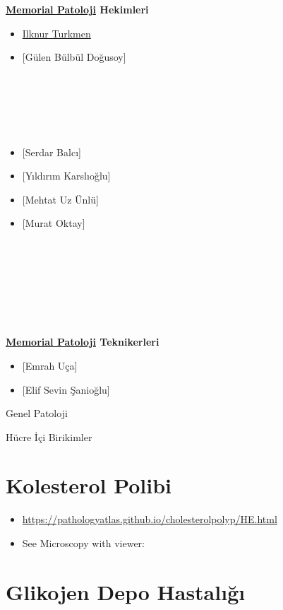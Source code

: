 \documentclass[
  letterpaper,
  DIV=11,
  numbers=noendperiod]{scrreprt}
\begin{document}
\textbf{\href{https://MemorialPath.github.io}{Memorial Patoloji}
Hekimleri}

\begin{itemize}
\item
  \href{https://www.memorial.com.tr/en/doctors/ilknur-turkmen-1975}{Ilknur
  Turkmen}
\item
  {[}Gülen Bülbül Doğusoy{]}\\
  \strut \\
  \strut \\
  \strut \\
\item
  {[}Serdar Balcı{]}\\
\item
  {[}Yıldırım Karslıoğlu{]}
\item
  {[}Mehtat Uz Ünlü{]}
\item
  {[}Murat Oktay{]}\\
  \strut \\
  \strut \\
  \strut \\
  \strut \\
\end{itemize}

\textbf{\href{https://MemorialPath.github.io}{Memorial Patoloji}
Teknikerleri}

\begin{itemize}
\item
  {[}Emrah Uça{]}
\item
  {[}Elif Sevin Şanioğlu{]}
\end{itemize}

Genel Patoloji

Hücre İçi Birikimler

\hypertarget{kolesterol-polibi}{%
\chapter{Kolesterol Polibi}\label{kolesterol-polibi}}

\begin{itemize}
\item
  \url{https://pathologyatlas.github.io/cholesterolpolyp/HE.html}
\item
  See Microscopy with viewer:
\end{itemize}

\hypertarget{glikojen-depo-hastalux131ux11fux131}{%
\chapter{Glikojen Depo
Hastalığı}\label{glikojen-depo-hastalux131ux11fux131}}
\end{document}
